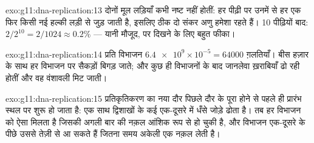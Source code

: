 \begin{solution}{exo:g11:dna-replication:13}
दोनों मूल लड़ियाँ कभी नष्ट नहीं होतीं: हर पीढ़ी पर उनमें से हर एक फिर
किसी नई हल्की लड़ी से जुड़ जाती है, इसलिए ठीक दो संकर अणु हमेशा रहते हैं।
10 पीढ़ियों बाद: $2/2^{10} = 2/1024
\approx 0.2\%$ --- यानी मौजूद, पर दिखने के लिए बहुत फीका।
\end{solution}

\begin{solution}{exo:g11:dna-replication:14}
प्रति विभाजन $\num{6.4e9} \times 10^{-5} = \num{64000}$ ग़लतियाँ। बीस
हज़ार  के साथ हर विभाजन पर सैकड़ों  बिगड़ जाते; और कुछ ही विभाजनों
के बाद  जानलेवा ख़राबियाँ ढो रही होतीं और वह वंशावली मिट जाती।
\end{solution}

\begin{solution}{exo:g11:dna-replication:15}
प्रतिकृतिकरण का नया दौर पिछले दौर के पूरा होने से पहले ही प्रारंभ स्थल पर
शुरू हो जाता है:  एक साथ द्विशाखों के कई एक-दूसरे में धँसे जोड़े
ढोता है। तब हर विभाजन को ऐसा  मिलता है जिसकी अगली बार की नक़ल
आंशिक रूप से हो चुकी है, और विभाजन एक-दूसरे के पीछे उससे तेज़ी से आ सकते
हैं जितना समय अकेली एक नक़ल लेती है।
\end{solution}

